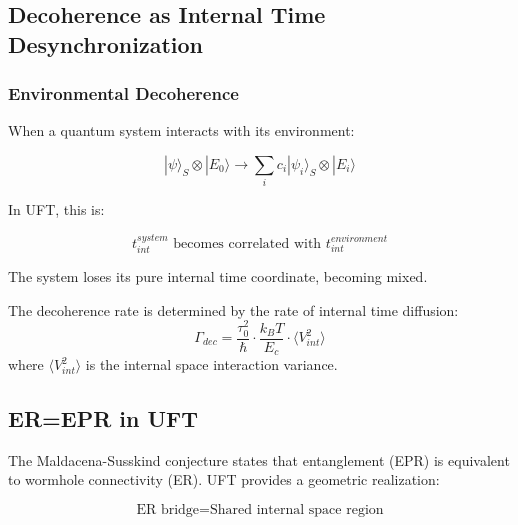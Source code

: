 \subsection{Decoherence as Internal Time Desynchronization}

\subsubsection{Environmental Decoherence}

When a quantum system interacts with its environment:

\begin{equation}
    |\psi\rangle_S \otimes |E_0\rangle \rightarrow \sum_i c_i |\psi_i\rangle_S \otimes |E_i\rangle
\end{equation}

In UFT, this is:

\begin{equation}
    t_{int}^{system} \text{ becomes correlated with } t_{int}^{environment}
\end{equation}

The system loses its pure internal time coordinate, becoming mixed.

\begin{theorem}
The decoherence rate is determined by the rate of internal time diffusion:
\begin{equation}
    \Gamma_{dec} = \frac{\tau_0^2}{\hbar} \cdot \frac{k_B T}{E_c} \cdot \langle V_{int}^2 \rangle
\end{equation}
where $\langle V_{int}^2 \rangle$ is the internal space interaction variance.
\end{theorem}

\subsection{ER=EPR in UFT}

The Maldacena-Susskind conjecture states that entanglement (EPR) is equivalent to wormhole connectivity (ER). UFT provides a geometric realization:

\begin{equation}
    \text{ER bridge} = \text{Shared internal space region}
\end{equation}

